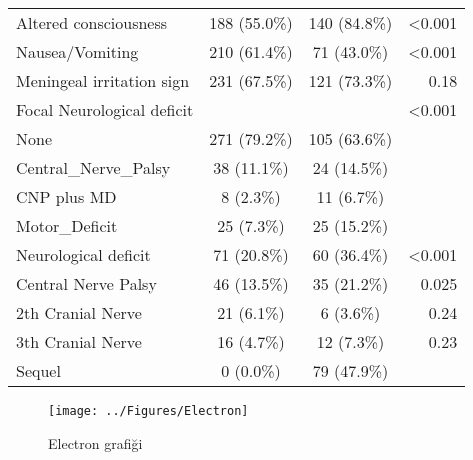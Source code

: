 \begin{landscape}
\begin{table}[htbp]
\begin{tabular}{lccr}
     	Altered consciousness                         &   188 (55.0\%)    &             140 (84.8\%)             &               <0.001 \\
     	Nausea/Vomiting                               &   210 (61.4\%)    &             71 (43.0\%)              &               <0.001 \\
     	Meningeal irritation sign                     &   231 (67.5\%)    &             121 (73.3\%)             &                 0.18 \\
     	Focal Neurological deficit                    &                   &                                      &               <0.001 \\
     	None                                          &   271 (79.2\%)    &             105 (63.6\%)             &  \\
     	Central\_Nerve\_Palsy                         &    38 (11.1\%)    &             24 (14.5\%)              &  \\
     	CNP plus MD                                   &     8 (2.3\%)     &              11 (6.7\%)              &  \\
     	Motor\_Deficit                                &    25 (7.3\%)     &             25 (15.2\%)              &  \\
     	Neurological deficit                          &    71 (20.8\%)    &             60 (36.4\%)              &               <0.001 \\
     	Central Nerve Palsy                           &    46 (13.5\%)    &             35 (21.2\%)              &                0.025 \\
     	2th Cranial Nerve                             &    21 (6.1\%)     &              6 (3.6\%)               &                 0.24 \\
     	3th Cranial Nerve                             &    16 (4.7\%)     &              12 (7.3\%)              &                 0.23 \\
     	Sequel                                        &     0 (0.0\%)     &             79 (47.9\%)              &  \\ \bottomrule
     \end{tabular}%
   \label{tab:addlabel}%
 \end{table}%
\end{landscape}
\newpage
\pagestyle{plain}
\begin{landscape}
\begin{figure}[htpn]
\centering
\texttt{[image: ../Figures/Electron]}
\caption[e1]{Electron grafiği}
\label{fig:Electron}
\end{figure}
\end{landscape}
\newpage


